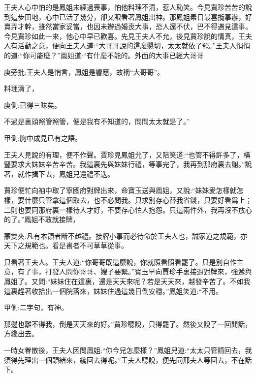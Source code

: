 \begin{parag}
    王夫人心中怕的是鳳姐未經過喪事，怕他料理不清，惹人恥笑。今見賈珍苦苦的說到這步田地，心中已活了幾分，卻又眼看著鳳姐出神。那鳳姐素日最喜攬事辦，好賣弄才幹，雖然當家妥當，也因未辦過婚喪大事，恐人還不伏，巴不得遇見這事。今見賈珍如此一來，他心中早已歡喜。先見王夫人不允，後見賈珍說的情真，王夫人有活動之意，便向王夫人道:“大哥哥說的這麼懇切，太太就依了罷。”王夫人悄悄的道:“你可能麼？”鳳姐道:“有什麼不能的。外面的大事已經大哥哥\begin{note}庚旁批:王夫人是悄言，鳳姐是響應，故稱“大哥哥”。\end{note}料理清了，\begin{note}庚側:已得三昧矣。\end{note}不過是裏頭照管照管，便是我有不知道的，問問太太就是了。”\begin{note}甲側:胸中成見已有之語。\end{note}王夫人見說的有理，便不作聲。賈珍見鳳姐允了，又陪笑道:“也管不得許多了，橫豎要求大妹妹辛苦辛苦。我這裏先與妹妹行禮，等事完了，我再到那府裏去謝。”說著，就作揖下去，鳳姐兒還禮不迭。
\end{parag}


\begin{parag}
    賈珍便忙向袖中取了寧國府對牌出來，命寶玉送與鳳姐，又說:“妹妹愛怎樣就怎樣，要什麼只管拿這個取去，也不必問我。只求別存心替我省錢，只要好看爲上；二則也要同那府裏一樣待人才好，不要存心怕人抱怨。只這兩件外，我再沒不放心的了。”鳳姐不敢就接牌，\begin{note}蒙雙夾:凡有本領者斷不越禮。接牌小事而必待命於王夫人也，誠家道之規範，亦天下之規範也。看是書者不可草草從事。\end{note}只看著王夫人。王夫人道:“你哥哥既這麼說，你就照看照看罷了。只是別自作主意，有了事，打發人問你哥哥、嫂子要緊。”寶玉早向賈珍手裏接過對牌來，強遞與鳳姐了。又問:“妹妹住在這裏，還是天天來呢？若是天天來，越發辛苦了。不如我這裏趕著收拾出一個院落來，妹妹住過這幾日倒安穩。”鳳姐笑道:“不用。\begin{note}甲側:二字句，有神。\end{note}那邊也離不得我，倒是天天來的好。”賈珍聽說，只得罷了。然後又說了一回閒話，方纔出去。
\end{parag}


\begin{parag}
    一時女眷散後，王夫人因問鳳姐:“你今兒怎麼樣？”鳳姐兒道:“太太只管請回去，我須得先理出一個頭緒來，纔回去得呢。”王夫人聽說，便先同邢夫人等回去，不在話下。
\end{parag}


